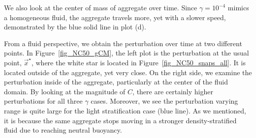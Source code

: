 We also look at the center of mass of aggregate over time. Since $\gamma = 10^{-4}$ mimics a homogeneous fluid, the aggregate travels more, yet with a slower speed, demonstrated by the blue solid line in plot (d).
\par
From a fluid perspective, we obtain the perturbation over time at two different points. In Figure~\ref{fig_NC50_gCM}, the left plot is the perturbation at the usual point, $\vec{x}^{\star}$, where the white star is located in Figure~\ref{fig_NC50_snaps_all}. It is located outside of the aggregate, yet very close. On the right side, we examine the perturbation inside of the aggregate, particularly at the center of the fluid domain. By looking at the magnitude of $C$, there are certainly higher perturbations for all three $\gamma$ cases. Moreover, we see the perturbation varying range is quite large for the light stratification case (blue line). As we mentioned, it is because the same aggregate stops moving in a stronger density-stratified fluid due to reaching neutral buoyancy.
